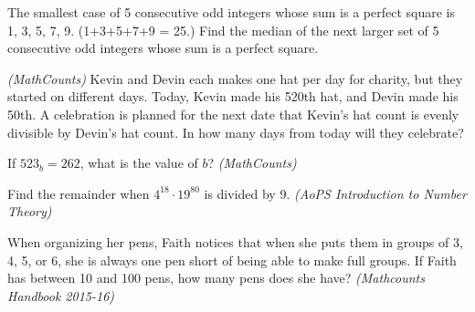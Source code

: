 \documentclass[9pt]{beamer}
\begin{document}
    \begin{frame}[t]{8.4}
    \begin{block}{}
        The smallest case of 5 consecutive odd integers whose sum is a perfect square is 1, 3, 5, 7, 9. (1+3+5+7+9 = 25.) Find the median of the next larger set of 5 consecutive odd integers whose sum is a perfect square.
        
    \end{block}
    \end{frame}
    
    \begin{frame}[t]{8.5}
    \begin{block}{}
        \textit{(MathCounts)} Kevin and Devin each makes one hat per day for charity, but they started on different days. Today, Kevin made his 520th hat, and Devin made his 50th. A celebration is planned for the next date that Kevin’s hat count is evenly divisible by Devin’s hat count. In how many days from today will they celebrate?
        
    \end{block}
    \end{frame}
    
    
    \begin{frame}[t]{8.6}
    \begin{block}{}
        If $523_b = 262$, what is the value of $b$? \textit{(MathCounts)} 
        
    \end{block}
    \end{frame}
    
    \begin{frame}[t]{8.7}
    \begin{block}{}
        Find the remainder when $4^{18}\cdot19^{80}$ is divided by 9. \textit{(AoPS Introduction to Number Theory)} 
        
    \end{block}
    \end{frame}
    
    \begin{frame}[t]{8.8}
    \begin{block}{}
        When organizing her pens, Faith notices that when she puts them in groups of 3, 4, 5, or 6, she is always one pen short of being able to make full groups. If Faith has between 10 and 100 pens, how many pens does she have? \textit{(Mathcounts Handbook 2015-16)}
         
    \end{block}
    \end{frame}
    
\end{document}
